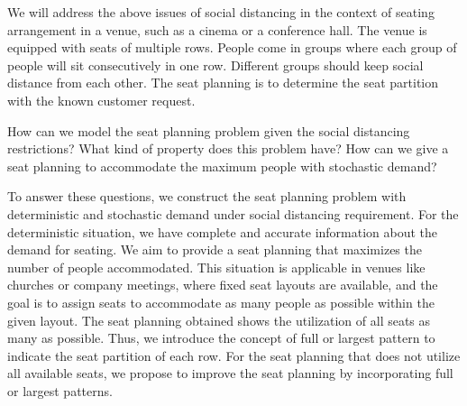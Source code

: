 



We will address the above issues of social distancing in the context of seating arrangement in a venue, such as a cinema or a conference hall. The venue is equipped with seats of multiple rows.  People come in groups where each group of people will sit consecutively in one row. Different groups should keep social distance from each other. The seat planning is to determine the seat partition with the known customer request. 

How can we model the seat planning problem given the social distancing restrictions? What kind of property does this problem have? How can we give a seat planning to accommodate the maximum people with stochastic demand?

To answer these questions, we construct the seat planning problem with deterministic and stochastic demand under social distancing requirement. For the deterministic situation, we have complete and accurate information about the demand for seating. We aim to provide a seat planning that maximizes the number of people accommodated. This situation is applicable in venues like churches or company meetings, where fixed seat layouts are available, and the goal is to assign seats to accommodate as many people as possible within the given layout. The seat planning obtained shows the utilization of all seats as many as possible. Thus, we introduce the concept of full or largest pattern to indicate the seat partition of each row. For the seat planning that does not utilize all available seats, we propose to improve the seat planning by incorporating full or largest patterns.


